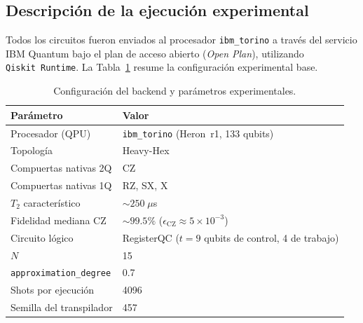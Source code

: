 \documentclass[12pt, spanish]{book}
\begin{document}
\subsection{Descripción de la ejecución experimental}
\label{subsec:config_hardware}

Todos los circuitos fueron enviados al procesador \texttt{ibm\_torino} a través del servicio IBM Quantum bajo el plan de acceso abierto (\textit{Open Plan}), utilizando \texttt{Qiskit~Runtime}. La Tabla~\ref{tab:config_hardware} resume la configuración experimental base.

\begin{table}[H]
    \centering
    \caption{Configuración del backend y parámetros experimentales.\\}
    \label{tab:config_hardware}
    \begin{tabular}{ll}
        \hline
        \textbf{Parámetro}             & \textbf{Valor}                                                  \\
        \hline
        Procesador (QPU)               & \texttt{ibm\_torino} (Heron~r1, 133 qubits)                     \\
        Topología                      & Heavy-Hex                                                       \\
        Compuertas nativas 2Q          & CZ                                                              \\
        Compuertas nativas 1Q          & RZ, SX, X                                                       \\
        $T_2$ característico           & $\sim 250\;\mu$s                                                \\
        Fidelidad mediana CZ           & $\sim 99.5\%$ ($\epsilon_{\text{CZ}} \approx 5 \times 10^{-3}$) \\
        Circuito lógico                & RegisterQC ($t = 9$ qubits de control, 4 de trabajo)            \\
        $N$                            & 15                                                              \\
        \texttt{approximation\_degree} & 0.7                                                             \\
        Shots por ejecución            & 4096                                                            \\
        Semilla del transpilador       & 457                                                             \\
        \hline
    \end{tabular}
\end{table}
\end{document}
